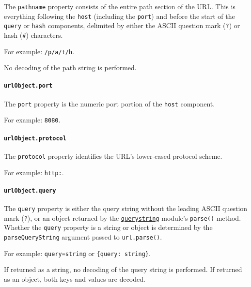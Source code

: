 The \texttt{pathname} property consists of the entire path section of
the URL. This is everything following the \texttt{host} (including the
\texttt{port}) and before the start of the \texttt{query} or
\texttt{hash} components, delimited by either the ASCII question mark
(\texttt{?}) or hash (\texttt{\#}) characters.

For example: \texttt{\textquotesingle{}/p/a/t/h\textquotesingle{}}.

No decoding of the path string is performed.

\paragraph{\texorpdfstring{\texttt{urlObject.port}}{urlObject.port}}\label{urlobject.port}

The \texttt{port} property is the numeric port portion of the
\texttt{host} component.

For example: \texttt{\textquotesingle{}8080\textquotesingle{}}.

\paragraph{\texorpdfstring{\texttt{urlObject.protocol}}{urlObject.protocol}}\label{urlobject.protocol}

The \texttt{protocol} property identifies the URL's lower-cased protocol
scheme.

For example: \texttt{\textquotesingle{}http:\textquotesingle{}}.

\paragraph{\texorpdfstring{\texttt{urlObject.query}}{urlObject.query}}\label{urlobject.query}

The \texttt{query} property is either the query string without the
leading ASCII question mark (\texttt{?}), or an object returned by the
\href{querystring.md}{\texttt{querystring}} module's \texttt{parse()}
method. Whether the \texttt{query} property is a string or object is
determined by the \texttt{parseQueryString} argument passed to
\texttt{url.parse()}.

For example: \texttt{\textquotesingle{}query=string\textquotesingle{}}
or
\texttt{\{\textquotesingle{}query\textquotesingle{}:\ \textquotesingle{}string\textquotesingle{}\}}.

If returned as a string, no decoding of the query string is performed.
If returned as an object, both keys and values are decoded.


